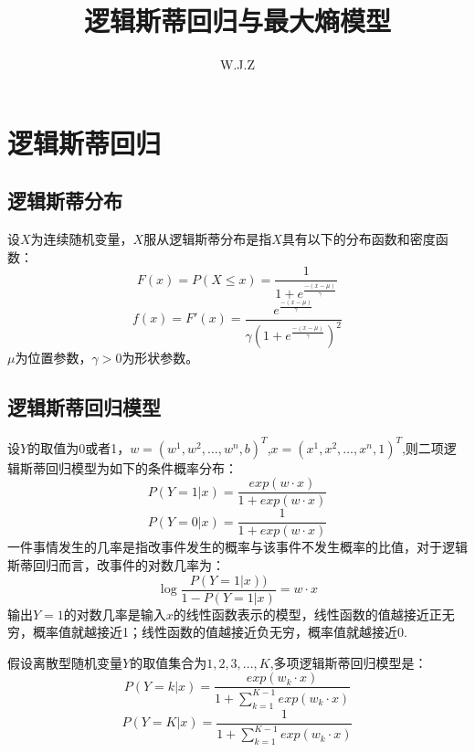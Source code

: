 \documentclass{article}
\title{逻辑斯蒂回归与最大熵模型}
\author{W.J.Z}
\date{}
\begin{document}
	\maketitle
	\section{逻辑斯蒂回归}
	\subsection{逻辑斯蒂分布}
	设$X$为连续随机变量，$X$服从逻辑斯蒂分布是指$X$具有以下的分布函数和密度函数：
	\begin{equation}
	F\left ( x \right )=P\left ( X\leq x \right )=\frac{1}{1+e^{\frac{-\left ( x-\mu  \right )}{\gamma }}}
	\end{equation}
	\begin{equation}
	f\left ( x \right )={F}'\left ( x \right )=\frac{e^{\frac{-\left ( x-\mu  \right )}{\gamma }}}{\gamma\left ( 1+ e^{\frac{-\left ( x-\mu  \right )}{\gamma }}\right )^2 }
	\end{equation}
	$\mu $为位置参数，$\gamma > 0$为形状参数。
	\subsection{逻辑斯蒂回归模型}
	设$Y$的取值为0或者1，$w=(w^{1},w^{2},\ldots,w^{n},b)^{T}$,$x=(x^{1},x^{2},\ldots,x^{n},1)^{T}$,则二项逻辑斯蒂回归模型为如下的条件概率分布：
	\begin{equation}
	P\left ( Y=1|x \right )=\frac{exp\left ( w\cdot x \right )}{1+exp\left ( w\cdot x \right )}
	\end{equation}
	\begin{equation}
	P\left ( Y=0|x \right )=\frac{1}{1+exp\left ( w\cdot x \right )}
	\end{equation}
	一件事情发生的几率是指改事件发生的概率与该事件不发生概率的比值，对于逻辑斯蒂回归而言，改事件的对数几率为：
	\begin{equation}
	\log \frac{P\left ( Y=1|x \right ))}{1-P\left ( Y=1|x \right )}=w\cdot x
	\end{equation}
	输出$Y=1$的对数几率是输入$x$的线性函数表示的模型，线性函数的值越接近正无穷，概率值就越接近1；线性函数的值越接近负无穷，概率值就越接近0.
	
	假设离散型随机变量$Y$的取值集合为${1,2,3,...,K}$,多项逻辑斯蒂回归模型是：
	\begin{equation}
	P\left ( Y=k|x \right )=\frac{exp\left ( w_{k}\cdot x \right )}{1+\sum_{k=1}^{K-1}exp\left ( w_{k}\cdot x \right )}
	\end{equation}
	\begin{equation}
	P\left ( Y=K|x \right )=\frac{1}{1+\sum_{k=1}^{K-1}exp\left ( w_{k}\cdot x \right )}
	\end{equation}
\end{document}
